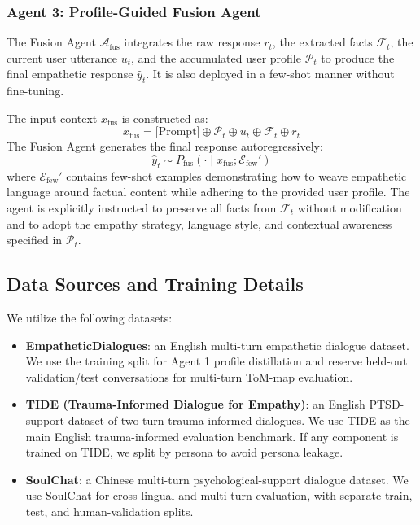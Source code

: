 \documentclass[11pt]{article}
\begin{document}
\subsubsection{Agent 3: Profile-Guided Fusion Agent}
\label{subsec:agent_fusion}

The Fusion Agent $\mathcal{A}_{\text{fus}}$ integrates the raw response $r_t$, the extracted facts $\mathcal{F}_t$, the current user utterance $u_t$, and the accumulated user profile $\mathcal{P}_t$ to produce the final empathetic response $\hat{y}_t$. It is also deployed in a few-shot manner without fine-tuning.

The input context $x_{\text{fus}}$ is constructed as:
\begin{equation}
    x_{\text{fus}} = \text{[Prompt]} \oplus \mathcal{P}_t \oplus u_t \oplus \mathcal{F}_t \oplus r_t
\end{equation}
The Fusion Agent generates the final response autoregressively:
\begin{equation}
    \hat{y}_t \sim P_{\text{fus}}(\cdot \mid x_{\text{fus}}; \mathcal{E}_{\text{few}}')
\end{equation}
where $\mathcal{E}_{\text{few}}'$ contains few-shot examples demonstrating how to weave empathetic language around factual content while adhering to the provided user profile. The agent is explicitly instructed to preserve all facts from $\mathcal{F}_t$ without modification and to adopt the empathy strategy, language style, and contextual awareness specified in $\mathcal{P}_t$.

\subsection{Data Sources and Training Details}
\label{subsec:data}

We utilize the following datasets:

\begin{itemize}
    \item \textbf{EmpatheticDialogues}: an English multi-turn empathetic dialogue dataset. We use the training split for Agent 1 profile distillation and reserve held-out validation/test conversations for multi-turn ToM-map evaluation.
    \item \textbf{TIDE (Trauma-Informed Dialogue for Empathy)}: an English PTSD-support dataset of two-turn trauma-informed dialogues. We use TIDE as the main English trauma-informed evaluation benchmark. If any component is trained on TIDE, we split by persona to avoid persona leakage.
    \item \textbf{SoulChat}: a Chinese multi-turn psychological-support dialogue dataset. We use SoulChat for cross-lingual and multi-turn evaluation, with separate train, test, and human-validation splits.
\end{itemize}
\end{document}
